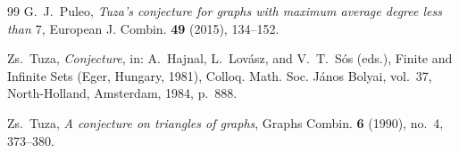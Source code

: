 \documentclass{amsart}
\theoremstyle{definition}
\numberwithin{equation}{section}
\numberwithin{table}{section}
\begin{document}
\begin{thebibliography}{99}
G.~J.~Puleo, \emph{Tuza's conjecture for graphs with maximum average degree less than $7$}, European J. Combin. \textbf{49} (2015), 134--152.

Zs.~Tuza, \emph{Conjecture}, in: A.~Hajnal, L.~Lov\'asz, and V.~T.~S\'os (eds.), Finite and Infinite Sets (Eger, Hungary, 1981), Colloq. Math. Soc. J\'anos Bolyai, vol.~37, North-Holland, Amsterdam, 1984, p.~888.

Zs.~Tuza, \emph{A conjecture on triangles of graphs}, Graphs Combin. \textbf{6} (1990), no.~4, 373--380.

\end{thebibliography}
\end{document}
